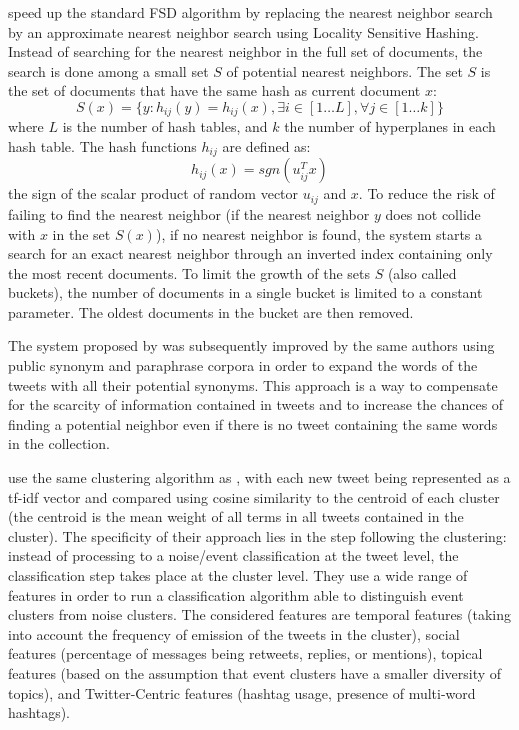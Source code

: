 \citet{petrovic_streaming_2010} speed up the standard FSD algorithm by replacing the nearest neighbor search by an approximate nearest neighbor search using Locality Sensitive Hashing. Instead of searching for the nearest neighbor in the full set of documents, the search is done among a small set $S$ of potential nearest neighbors. The set $S$ is the set of documents that have the same hash as current document $x$:
$$
S(x) = \{y: h_{ij}(y) = h_{ij}(x), \exists i \in [1 \ldots L], \forall j \in [1 \ldots k]\}
$$
where $L$ is the number of hash tables, and $k$ the number of hyperplanes in each hash table. The hash functions $h_{ij}$ are defined as:
$$
h_{ij}(x) = sgn(u_{ij}^Tx)
$$
the sign of the scalar product of random vector $u_{ij}$ and $x$. To reduce the risk of failing to find the nearest neighbor (if the nearest neighbor $y$ does not collide with $x$ in the set $S(x)$), if no nearest neighbor is found, the system starts a search for an exact nearest neighbor through an inverted index containing only the most recent documents. To limit the growth of the sets $S$ (also called buckets), the number of documents in a single bucket is limited to a constant parameter. The oldest documents in the bucket are then removed. 

The system proposed by \citet{petrovic_streaming_2010} was subsequently improved by the same authors \citep{petrovic_using_2012} using public synonym and paraphrase corpora in order to expand the words of the tweets with all their potential synonyms. This approach is a way to compensate for the scarcity of information contained in tweets and to increase the chances of finding a potential neighbor even if there is no tweet containing the same words in the collection.

\citet{becker_beyond_2011} use the same clustering algorithm as \citet{sankaranarayanan_twitterstand:_2009}, with each new tweet being represented as a tf-idf vector and compared using cosine similarity to the centroid of each cluster (the centroid is the mean weight of all terms in all tweets contained in the cluster). The specificity of their approach lies in the step following the clustering: instead of processing to a noise/event classification at the tweet level, the classification step takes place at the cluster level. They use a wide range of features in order to run a classification algorithm able to distinguish event clusters from noise clusters. The considered features are temporal features (taking into account the frequency of emission of the tweets in the cluster), social features (percentage of messages being retweets, replies, or mentions), topical features (based on the assumption that event clusters have a smaller diversity of topics), and Twitter-Centric features (hashtag usage, presence of multi-word hashtags).

